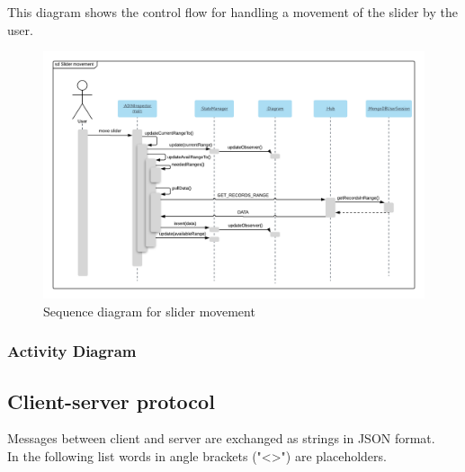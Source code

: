 \documentclass[oneside, english, final]{design}
\begin{document}
\newpage
This diagram shows the control flow for handling a movement of the slider by the user.\\
\begin{center}
	\begin{figure}
		\includegraphics[width=\textwidth]{sd_frontend_comm-slider_movement.png}
		\caption{Sequence diagram for slider movement}
		\label{fig:sd_slider_movement}
	\end{figure}
\end{center}


\subsubsection{Activity Diagram}
\newpage


\subsection{Client-server protocol}

Messages between client and server are exchanged as strings in JSON format.
\\
In the following list words in angle brackets ("<>") are placeholders.
\\
\end{document}
